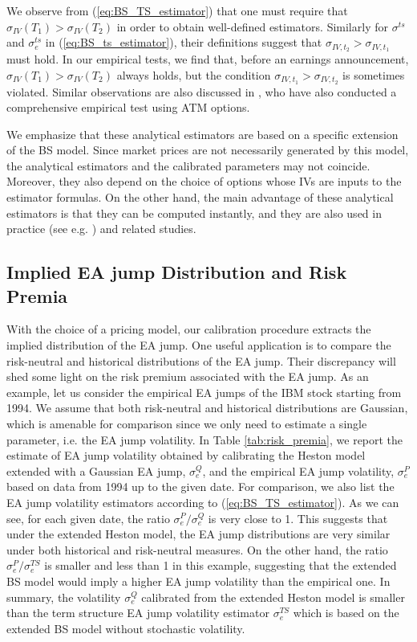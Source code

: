 \documentclass[11pt]{article}
\numberwithin{equation}{section}
\numberwithin{theorem}{section}
\begin{document}
We observe from  (\ref{eq:BS_TS_estimator}) that one must require that 
$\sigma_{IV}\left(T_{1}\right)>\sigma_{IV}\left(T_{2}\right)$ in order to obtain well-defined estimators.  Similarly for  $\sigma^{ts}$ and $\sigma^{ts}_e$ in (\ref{eq:BS_ts_estimator}), their definitions suggest  that $\sigma_{IV,t_{2}}>\sigma_{IV,t_{1}}$
must hold.  In our empirical tests, we find that, before an earnings announcement, $\sigma_{IV}\left(T_{1}\right)>\sigma_{IV}\left(T_{2}\right)$ always holds, but  the condition $\sigma_{IV,t_{1}}>\sigma_{IV,t_{2}}$ is sometimes  violated. Similar observations are also discussed in  \citet{Dubinsky2006}, who have also conducted  a comprehensive empirical test using ATM options. 

We emphasize that these analytical estimators   are based on a specific extension of the BS model.  Since market prices are not necessarily generated by this model,  the analytical estimators and the calibrated parameters  may  not coincide. Moreover, they  also depend on the choice of  options whose IVs are inputs to  the estimator formulas. On the other hand, the main advantage of these analytical estimators is that they can be computed instantly, and they are also used in practice  (see e.g. \citet{jpmorgan}) and related studies. 


\subsection{Implied EA jump Distribution and Risk Premia}\label{sub:premia}
With the choice of a pricing model, our  calibration procedure  extracts  the implied distribution of the EA jump.  One useful application is to compare  the risk-neutral and historical  distributions of the EA jump. Their discrepancy will shed some light on the risk premium associated with the EA jump. 
 As an example, let us consider the empirical  EA jumps of the IBM stock starting from 1994. We assume that both  risk-neutral and historical  distributions are Gaussian, which is amenable for comparison  since  we only need to estimate a single parameter, i.e.  the EA jump volatility. In Table \ref{tab:risk_premia}, we   report the estimate of EA jump volatility obtained by calibrating the Heston model extended with a Gaussian EA jump, $\sigma_e^Q$, and the empirical EA jump volatility,  $\sigma_e^P$ based on data  from 1994 up to the given date. For comparison, we  also list   the EA jump volatility estimators  according to  (\ref{eq:BS_TS_estimator}).  As we can see, for each given date, the ratio $\sigma_e^P/\sigma_e^Q$ is very  close to 1. This suggests that under the extended Heston model, the EA jump distributions are very similar under both historical and risk-neutral measures. On the other hand,  the ratio $\sigma_e^P/\sigma_e^{TS}$  is smaller and less than  1 in this example, suggesting that the extended BS model would imply a  higher EA jump volatility than the empirical one.  In summary,  the volatility  $\sigma_e^Q$ calibrated from  the extended Heston model  is smaller than the term structure EA jump volatility estimator $\sigma_e^{TS}$  which is based on the extended BS model without stochastic volatility.  
\end{document}
